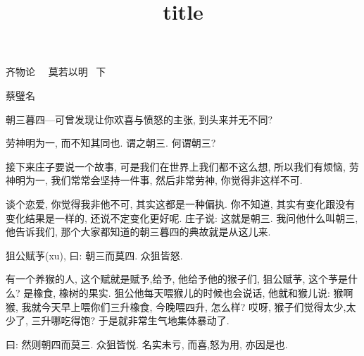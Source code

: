 \documentclass[11pt]{article}
\begin{document}
\kaishu 
	
\setcounter{section}{6}
\title{title}
\thispagestyle{empty}

\begin{center}
	{\Large \kaishu 齐物论 \ \ 莫若以明 \ 下}
	
	
	{\vspace{-0.2cm}}
	
	{\kaishu 蔡璧名}
\end{center}


{\Large {\color{purple} 朝三暮四---可曾发现让你欢喜与愤怒的主张, 到头来并无不同?}}

\begin{center}
	{\color{magenta} 劳神明为一, 而不知其同也. 谓之朝三. 何谓朝三?}
\end{center}

\vspace{-0.5cm}

接下来庄子要说一个故事, 可是我们在世界上我们都不这么想, 所以我们有烦恼, {\color{blue} 劳神明为一,} 我们常常会坚持一件事, 然后非常劳神, 你觉得非这样不可.

谈个恋爱, 你觉得我非他不可, 其实这都是一种偏执. 你不知道, 其实有变化跟没有变化结果是一样的, 还说不定变化更好呢. 庄子说: 这就是朝三. 我问他什么叫朝三, 他告诉我们, 那个大家都知道的朝三暮四的典故就是从这儿来.

\begin{center}
	{\color{magenta} 狙公赋芧(xu), 曰: 朝三而莫四. 众狙皆怒.}
\end{center}

\vspace{-0.5cm}

有一个养猴的人, 这个赋就是赋予,给予, 他给予他的猴子们, {\color{blue} 狙公赋芧}, 这个芧是什么? 是橡食, 橡树的果实. 狙公他每天喂猴儿的时候也会说话, 他就和猴儿说: 猴啊猴, 我就今天早上喂你们三升橡食, 今晚喂四升, 怎么样? 哎呀, 猴子们觉得太少,太少了, 三升哪吃得饱? 于是就非常生气地集体暴动了. 
\begin{center}
	{\color{magenta} 曰: 然则朝四而莫三. 众狙皆悦. 名实未亏, 而喜,怒为用, 亦因是也.}
\end{center}
\end{document}
